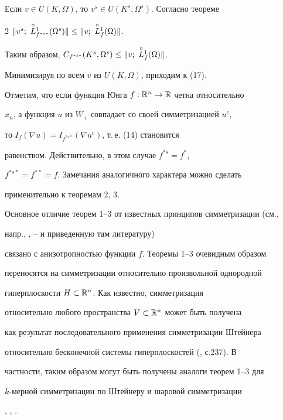  


\begin{pf} 


Если $v\in U(K,\Omega)$, то $v^s\in U(K^s,\Omega^s)$. Согласно теореме 


2\; $\|v^s;\ \cL^1_{f^{*s*}}(\Omega^s)\|\le\|v;\ \cL^1_f(\Omega)\|$. 


Таким образом, $C_{f^{*s*}}(K^s,\Omega^s)\le\|v;\ \cL^1_f(\Omega)\|$. 


Минимизируя по всем $v$ из $U(K,\Omega)$, приходим к (17). 


\end{pf} 


 


Отметим, что если функция Юнга $f:\Bbb R^n\to\Bbb R$ четна относительно 


$x_n$, а функция $u$ из $W_+$ совпадает со своей симметризацией $u^c$, 


то $I_f(\nabla u)=I_{f^{*s*}}(\nabla u^c)$, т.\,е. (14) становится 


равенством. Действительно, в этом случае $f^{*s}=f^*$, 


$f^{*s*}=f^{**}=f$. Замечания аналогичного характера можно сделать 


применительно к теоремам 2, 3. 


 


Основное отличие теорем 1--3 от известных принципов симметризации (см., 


напр., \cite{1}, \cite{10}--\cite{12} и приведенную там литературу) 


связано с анизотропностью функции $f$. Теоремы 1--3 очевидным образом 


переносятся на симметризации относительно произвольной однородной 


гиперплоскости $H\subset\Bbb R^n$. Как известно, симметризация 


относительно любого пространства $V\subset\Bbb R^n$ может быть получена 


как результат последовательного применения симметризации Штейнера 


относительно бесконечной системы гиперплоскостей (\cite{4}, с.237). В 


частности, таким образом могут быть получены аналоги теорем 1--3 для 


$k$-мерной симметризации по Штейнеру \cite{10} и шаровой симметризации 


\cite{1}, \cite{3}, \cite{11}. 


